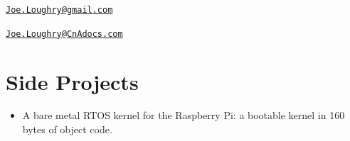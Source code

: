 \documentclass[12pt,twoside,letterpaper]{article}
\begin{document}


\vspace{-10mm}


\vspace{-7mm}


\vspace{-7mm}


\newpage


\vspace*{-23mm}\hfill\href{mailto:Joe.Loughry@gmail.com}%
{\nolinkurl{Joe.Loughry@gmail.com}}

\vspace*{-7mm}


\vspace{-7mm}


\vspace{-7mm}


\vspace{-7mm}


\vspace{-7mm}


\vspace{-7mm}


\vspace{3mm}

\noindent


\newpage


\vspace*{-23mm}\hfill\href{mailto:Joe.Loughry@CnAdocs.com}%
{\nolinkurl{Joe.Loughry@CnAdocs.com}}

\vspace*{-7mm}
\section*{Side Projects}
\vspace{-2mm}

\begin{itemize}
    \item A bare metal RTOS kernel for the Raspberry Pi: a bootable kernel
        in 160 bytes of object code.
    \end{itemize}

\vspace{-7mm}
\end{document}
